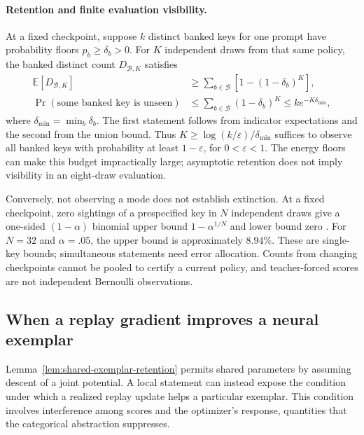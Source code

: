 \paragraph{Retention and finite evaluation visibility.}
At a fixed checkpoint, suppose $k$ distinct banked keys for one prompt have
probability floors $p_b\ge\delta_b>0$. For $K$ independent draws from that
same policy, the banked distinct count $D_{\mathcal B,K}$ satisfies
\[
 \begin{aligned}
 \mathbb E[D_{\mathcal B,K}]
 &\ge\sum_{b\in\mathcal B}\left[1-(1-\delta_b)^K\right],\\
 \Pr(\text{some banked key is unseen})
 &\le\sum_{b\in\mathcal B}(1-\delta_b)^K
 \le k e^{-K\delta_{\min}},
 \end{aligned}
\]
where $\delta_{\min}=\min_b\delta_b$. The first statement follows from
indicator expectations and the second from the union bound. Thus
$K\ge\log(k/\varepsilon)/\delta_{\min}$ suffices to observe all banked keys
with probability at least $1-\varepsilon$, for $0<\varepsilon<1$.
The energy floors can make this budget impractically large; asymptotic
retention does not imply visibility in an eight-draw evaluation.

Conversely, not observing a mode does not establish extinction. At a fixed
checkpoint, zero sightings of a prespecified key in $N$ independent draws
give a one-sided $(1-\alpha)$ binomial upper bound
$1-\alpha^{1/N}$ and lower bound zero \citep{clopper1934binomial}. For
$N=32$ and $\alpha=.05$, the upper bound is approximately $8.94\%$.
These are single-key bounds; simultaneous statements need error allocation.
Counts from changing checkpoints cannot be pooled to certify a current
policy, and teacher-forced scores are not independent Bernoulli observations.

\subsection{When a replay gradient improves a neural exemplar}
\label{app:theory-neural-replay-response}

Lemma~\ref{lem:shared-exemplar-retention} permits shared parameters by
assuming descent of a joint potential. A local statement can instead expose
the condition under which a realized replay update helps a particular
exemplar. This condition involves interference among scores and the optimizer's
response, quantities that the categorical abstraction suppresses.

